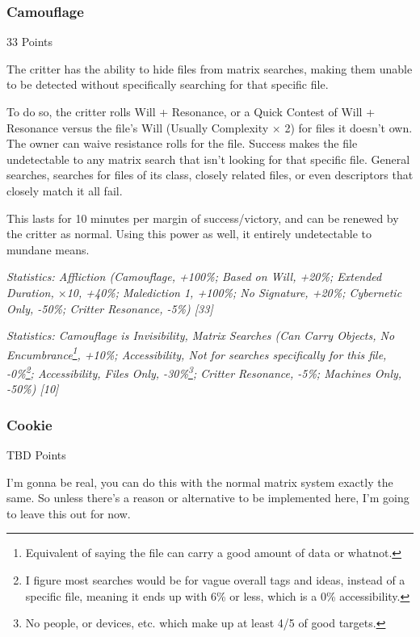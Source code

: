 \begin{multicols*}{3}
	\subsubsection{Camouflage}\label{camouflage}
	\begin{flushright}
		33 Points
	\end{flushright}

	The critter has the ability to hide files from matrix searches, making them unable to be detected without specifically searching for that specific file.
	
	To do so, the critter rolls Will + Resonance, or a Quick Contest of Will + Resonance versus the file's Will (Usually Complexity $\times$ 2) for files it doesn't own. The owner can waive resistance rolls for the file. Success makes the file undetectable to any matrix search that isn't looking for that specific file. General searches, searches for files of its class, closely related files, or even descriptors that closely match it all fail.
	
	This lasts for 10 minutes per margin of success/victory, and can be renewed by the critter as normal. Using this power as well, it entirely undetectable to mundane means.

	\textcolor{OliveGreen}{\textit{Statistics: Affliction (Camouflage, +100\%; Based on Will, +20\%; Extended Duration, $\times$10, +40\%; Malediction 1, +100\%; No Signature, +20\%; Cybernetic Only, -50\%; Critter Resonance, -5\%) [33]}}
	
	\textcolor{OliveGreen}{\textit{Statistics: Camouflage is Invisibility, Matrix Searches (Can Carry Objects, No Encumbrance\footnote{Equivalent of saying the file can carry a good amount of data or whatnot.}, +10\%; Accessibility, Not for searches specifically for this file, -0\%\footnote{I figure most searches would be for vague overall tags and ideas, instead of a specific file, meaning it ends up with 6\% or less, which is a 0\% accessibility.}; Accessibility, Files Only, -30\%\footnote{No people, or devices, etc. which make up at least 4/5 of good targets.}; Critter Resonance, -5\%; Machines Only, -50\%) [10] }}
	 
	\subsubsection{Cookie}\label{cookie}
	\begin{flushright}
		TBD Points
	\end{flushright}

	I'm gonna be real, you can do this with the normal matrix system exactly the same. So unless there's a reason or alternative to be implemented here, I'm going to leave this out for now.


\end{multicols*}
